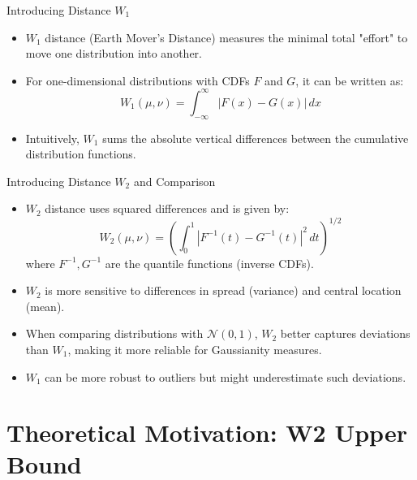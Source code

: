 \documentclass{beamer}
\begin{document}
\begin{frame}{Introducing Distance \(W_1\)}
\begin{itemize}
    \item \(W_1\) distance (Earth Mover's Distance) measures the minimal total "effort" to move one distribution into another.
    \item For one-dimensional distributions with CDFs \(F\) and \(G\), it can be written as:
    \[
        W_1(\mu, \nu) = \int_{-\infty}^\infty |F(x) - G(x)| \, dx
    \]
    \item Intuitively, \(W_1\) sums the absolute vertical differences between the cumulative distribution functions.
\end{itemize}
\end{frame}

\begin{frame}{Introducing Distance \(W_2\) and Comparison}
\begin{itemize}
    \item \(W_2\) distance uses squared differences and is given by:
    \[
        W_2(\mu, \nu) = \left( \int_0^1 |F^{-1}(t) - G^{-1}(t)|^2 \, dt \right)^{1/2}
    \]
    where \(F^{-1}, G^{-1}\) are the quantile functions (inverse CDFs).
    \item \(W_2\) is more sensitive to differences in spread (variance) and central location (mean).
    \item When comparing distributions with \(\mathcal{N}(0,1)\), \(W_2\) better captures deviations than \(W_1\), making it more reliable for Gaussianity measures.
    \item \(W_1\) can be more robust to outliers but might underestimate such deviations.
\end{itemize}
\end{frame}


\section{Theoretical Motivation: W2 Upper Bound}
\end{document}
